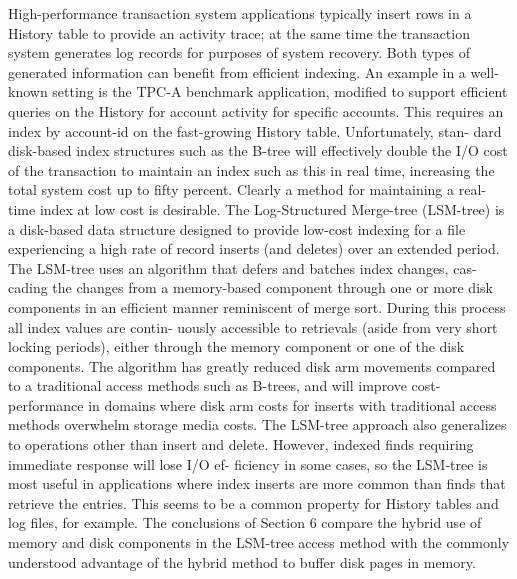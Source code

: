 High-performance transaction system applications typically insert rows in a
History table to provide an activity trace; at the same time the transaction system generates log
records for purposes of system recovery. Both types of generated information can benefit from
efficient indexing. An example in a well-known setting is the TPC-A benchmark application,
modified to support efficient queries on the History for account activity for specific accounts.
This requires an index by account-id on the fast-growing History table. Unfortunately, stan-
dard disk-based index structures such as the B-tree will effectively double the I/O cost of the
transaction to maintain an index such as this in real time, increasing the total system cost up to
fifty percent. Clearly a method for maintaining a real-time index at low cost is desirable. The
Log-Structured Merge-tree (LSM-tree) is a disk-based data structure designed to provide
low-cost indexing for a file experiencing a high rate of record inserts (and deletes) over an
extended period. The LSM-tree uses an algorithm that defers and batches index changes, cas-
cading the changes from a memory-based component through one or more disk components in an
efficient manner reminiscent of merge sort. During this process all index values are contin-
uously accessible to retrievals (aside from very short locking periods), either through the
memory component or one of the disk components. The algorithm has greatly reduced disk arm
movements compared to a traditional access methods such as B-trees, and will improve cost-
performance in domains where disk arm costs for inserts with traditional access methods
overwhelm storage media costs. The LSM-tree approach also generalizes to operations other
than insert and delete. However, indexed finds requiring immediate response will lose I/O ef-
ficiency in some cases, so the LSM-tree is most useful in applications where index inserts are
more common than finds that retrieve the entries. This seems to be a common property for
History tables and log files, for example. The conclusions of Section 6 compare the hybrid use
of memory and disk components in the LSM-tree access method with the commonly understood
advantage of the hybrid method to buffer disk pages in memory.


